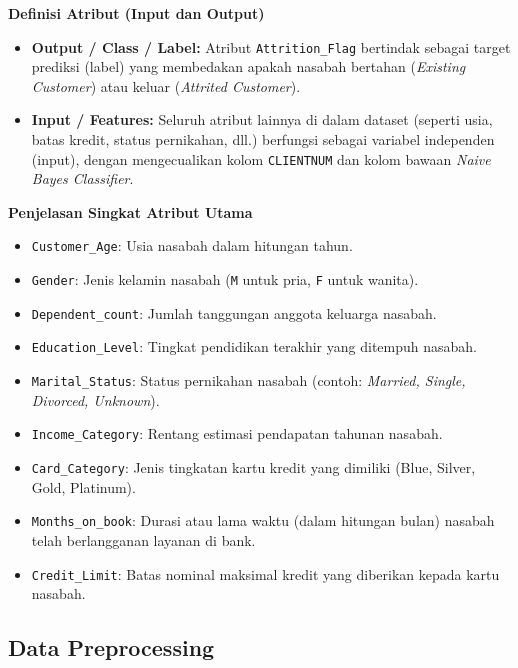\textbf{Definisi Atribut (Input dan Output)}
\begin{itemize}
    \item \textbf{Output / Class / Label:} Atribut \texttt{Attrition\_Flag} bertindak sebagai target prediksi (label) yang membedakan apakah nasabah bertahan (\textit{Existing Customer}) atau keluar (\textit{Attrited Customer}).
    \item \textbf{Input / Features:} Seluruh atribut lainnya di dalam dataset (seperti usia, batas kredit, status pernikahan, dll.) berfungsi sebagai variabel independen (input), dengan mengecualikan kolom \texttt{CLIENTNUM} dan kolom bawaan \textit{Naive Bayes Classifier}.
\end{itemize}

\textbf{Penjelasan Singkat Atribut Utama}
\begin{itemize}
    \item \texttt{Customer\_Age}: Usia nasabah dalam hitungan tahun.
    \item \texttt{Gender}: Jenis kelamin nasabah (\texttt{M} untuk pria, \texttt{F} untuk wanita).
    \item \texttt{Dependent\_count}: Jumlah tanggungan anggota keluarga nasabah.
    \item \texttt{Education\_Level}: Tingkat pendidikan terakhir yang ditempuh nasabah.
    \item \texttt{Marital\_Status}: Status pernikahan nasabah (contoh: \textit{Married, Single, Divorced, Unknown}).
    \item \texttt{Income\_Category}: Rentang estimasi pendapatan tahunan nasabah.
    \item \texttt{Card\_Category}: Jenis tingkatan kartu kredit yang dimiliki (Blue, Silver, Gold, Platinum).
    \item \texttt{Months\_on\_book}: Durasi atau lama waktu (dalam hitungan bulan) nasabah telah berlangganan layanan di bank.
    \item \texttt{Credit\_Limit}: Batas nominal maksimal kredit yang diberikan kepada kartu nasabah.
\end{itemize}


\subsection{Data Preprocessing}

